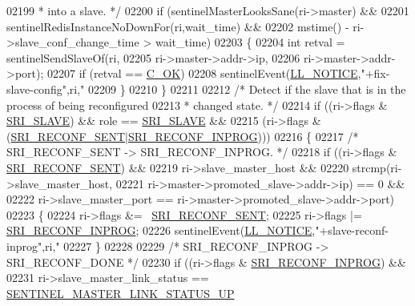 \begin{DoxyCode}
{{{{{{{{{{{{{{{{{{{{{{{{{{{{{{{{{{{{{{{{{{{{{02199 \textcolor{comment}{         * into a slave. */}
02200         \textcolor{keywordflow}{if} (sentinelMasterLooksSane(ri->master) &&
02201             sentinelRedisInstanceNoDownFor(ri,wait\_time) &&
02202             mstime() - ri->slave\_conf\_change\_time > wait\_time)
02203         \{
02204             \textcolor{keywordtype}{int} retval = sentinelSendSlaveOf(ri,
02205                     ri->master->addr->ip,
02206                     ri->master->addr->port);
02207             \textcolor{keywordflow}{if} (retval == \hyperlink{server_8h_a303769ef1065076e68731584e758d3e1}{C\_OK})
02208                 sentinelEvent(\hyperlink{server_8h_a8c54c191e436c7dd3012167212692401}{LL\_NOTICE},\textcolor{stringliteral}{"+fix-slave-config"},ri,\textcolor{stringliteral}{"%
02209         \}
02210     \}
02211 
02212     \textcolor{comment}{/* Detect if the slave that is in the process of being reconfigured}
02213 \textcolor{comment}{     * changed state. */}
02214     \textcolor{keywordflow}{if} ((ri->flags & \hyperlink{sentinel_8c_a4b9db21eda79d49bd9fdf2cf7b3178e8}{SRI\_SLAVE}) && role == \hyperlink{sentinel_8c_a4b9db21eda79d49bd9fdf2cf7b3178e8}{SRI\_SLAVE} &&
02215         (ri->flags & (\hyperlink{sentinel_8c_a9b307b68cb1615ead6aacb0de34910e6}{SRI\_RECONF\_SENT}|\hyperlink{sentinel_8c_a58c89f4aaa1bdfde4c25e3bb476c35aa}{SRI\_RECONF\_INPROG})))
02216     \{
02217         \textcolor{comment}{/* SRI\_RECONF\_SENT -> SRI\_RECONF\_INPROG. */}
02218         \textcolor{keywordflow}{if} ((ri->flags & \hyperlink{sentinel_8c_a9b307b68cb1615ead6aacb0de34910e6}{SRI\_RECONF\_SENT}) &&
02219             ri->slave\_master\_host &&
02220             strcmp(ri->slave\_master\_host,
02221                     ri->master->promoted\_slave->addr->ip) == 0 &&
02222             ri->slave\_master\_port == ri->master->promoted\_slave->addr->port)
02223         \{
02224             ri->flags &= ~\hyperlink{sentinel_8c_a9b307b68cb1615ead6aacb0de34910e6}{SRI\_RECONF\_SENT};
02225             ri->flags |= \hyperlink{sentinel_8c_a58c89f4aaa1bdfde4c25e3bb476c35aa}{SRI\_RECONF\_INPROG};
02226             sentinelEvent(\hyperlink{server_8h_a8c54c191e436c7dd3012167212692401}{LL\_NOTICE},\textcolor{stringliteral}{"+slave-reconf-inprog"},ri,\textcolor{stringliteral}{"%
02227         \}
02228 
02229         \textcolor{comment}{/* SRI\_RECONF\_INPROG -> SRI\_RECONF\_DONE */}
02230         \textcolor{keywordflow}{if} ((ri->flags & \hyperlink{sentinel_8c_a58c89f4aaa1bdfde4c25e3bb476c35aa}{SRI\_RECONF\_INPROG}) &&
02231             ri->slave\_master\_link\_status == \hyperlink{sentinel_8c_a8dc7f6cce8e6299e2422b8c65ca16418}{SENTINEL\_MASTER\_LINK\_STATUS\_UP}
}}}}}}}}}}}}}}}}}}}}}}}}}}}}}}}}}}}}}}}}}}}}}}}
\end{DoxyCode}
